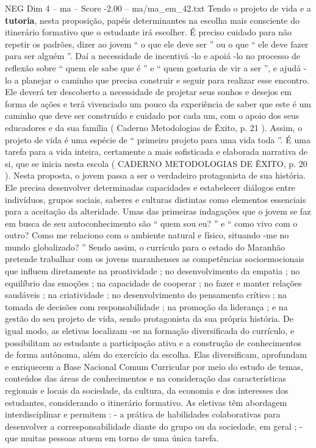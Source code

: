 \begin{textsample}{NEG Dim 4 – ma – Score -2.00 – ma/ma\_em\_42.txt}
Tendo o projeto de vida e a \textbf{tutoria}, nesta proposição, papéis determinantes na escolha mais consciente do itinerário formativo que o estudante irá escolher.
É preciso cuidado para não repetir os padrões, dizer ao jovem “ o que ele deve ser ” ou o que “ ele deve fazer para ser alguém ”.
Daí a necessidade de incentivá -lo e apoiá -lo no processo de reflexão sobre “ quem ele sabe que é ” e “ quem gostaria de vir a ser ”, e ajudá -lo a planejar o caminho que precisa construir e seguir para realizar esse encontro.
Ele deverá ter descoberto a necessidade de projetar seus sonhos e desejos em forma de ações e terá vivenciado um pouco da experiência de saber que este é um caminho que deve ser construído e cuidado por cada um, com o apoio dos seus educadores e da sua família ( Caderno Metodologias de Êxito, p. 21 ).
Assim, o projeto de vida é uma espécie de “ primeiro projeto para uma vida toda ”.
É uma tarefa para a vida inteira, certamente a mais sofisticada e elaborada narrativa de si, que se inicia nesta escola ( CADERNO METODOLOGIAS DE ÊXITO, p. 20 ).
Nesta proposta, o jovem passa a ser o verdadeiro protagonista de sua história.
Ele precisa desenvolver determinadas capacidades e estabelecer diálogos entre indivíduos, grupos sociais, saberes e culturas distintas como elementos essenciais para a aceitação da alteridade.
Umas das primeiras indagações que o jovem se faz em busca de seu autoconhecimento são “ quem sou eu? ” e “ como vivo com o outro?
Como me relaciono com o ambiente natural e físico, situando -me no mundo globalizado? ” Sendo assim, o currículo para o estado do Maranhão pretende trabalhar com os jovens maranhenses as competências socioemocionais que influem diretamente na proatividade ; no desenvolvimento da empatia ; no equilíbrio das emoções ; na capacidade de cooperar ; no fazer e manter relações saudáveis ; na criatividade ; no desenvolvimento do pensamento crítico ; na tomada de decisões com responsabilidade ; na promoção da liderança ; e na gestão do seu projeto de vida, sendo protagonista da sua própria história.
De igual modo, as eletivas localizam -se na formação diversificada do currículo, e possibilitam ao estudante a participação ativa e a construção de conhecimentos de forma autônoma, além do exercício da escolha.
Elas diversificam, aprofundam e enriquecem a Base Nacional Comum Curricular por meio do estudo de temas, conteúdos das áreas de conhecimentos e na consideração das características regionais e locais da sociedade, da cultura, da economia e dos interesses dos estudantes, considerando o itinerário formativo.
As eletivas têm abordagem interdisciplinar e permitem : - a prática de habilidades colaborativas para desenvolver a corresponsabilidade diante do grupo ou da sociedade, em geral ; - que muitas pessoas atuem em torno de uma única tarefa.

\end{textsample}
